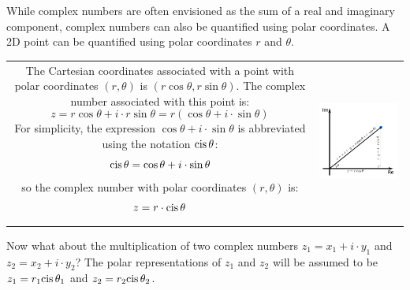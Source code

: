 \documentclass{article}
\newcommand{\cis}{\textnormal{cis}\,}
\begin{document}
While complex numbers are often envisioned as the sum of a real and imaginary component, complex numbers can also be quantified using polar coordinates. A 2D point can be quantified using polar coordinates \(r\) and \(\theta\). 

\begin{center}
\begin{tabular}{cc}
\parbox{0.5\textwidth}{
The Cartesian coordinates associated with a point with polar coordinates \((r, \theta)\) is \((r\cos\theta, r\sin\theta)\). The complex number associated with this point is: 
\[z = r \cos\theta + i \cdot r\sin\theta = r(\cos\theta + i \cdot \sin\theta)\]
For simplicity, the expression \(\cos\theta + i \cdot \sin\theta\) is abbreviated using the notation \(\cis\theta\): 
\[\cis\theta = \cos\theta + i \cdot \sin\theta\]
so the complex number with polar coordinates \((r,\theta)\) is:
\[z = r \cdot \cis\theta\]
} & \parbox{0.5\textwidth}{
\includegraphics[scale = 0.7]{complex_number}
}
\end{tabular}
\end{center}


Now what about the multiplication of two complex numbers \(z_1 = x_1 + i \cdot y_1\) and \(z_2 = x_2 + i \cdot y_2\)? The polar representations of \(z_1\) and \(z_2\) will be assumed to be \(z_1 = r_1 \cis\theta_1\) and \(z_2 = r_2\cis\theta_2\).  
\end{document}
